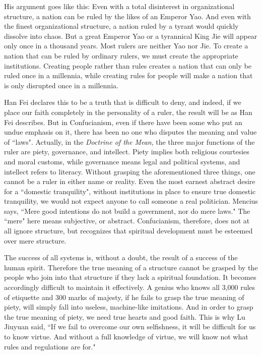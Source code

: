 His argument goes like this: Even with a total disinterest in organizational structure, a nation can be ruled by the likes of an Emperor Yao. And even with the finest organizational structure, a nation ruled by a tyrant would quickly dissolve into chaos. But a great Emperor Yao or a tyrannical King Jie will appear only once in a thousand years. Most rulers are neither Yao nor Jie. To create a nation that can be ruled by ordinary rulers, we must create the appropriate institutions. Creating people rather than rules creates a nation that can only be ruled once in a millennia, while creating rules for people will make a nation that is only disrupted once in a millennia.

Han Fei declares this to be a truth that is difficult to deny, and indeed, if we place our faith completely in the personality of a ruler, the result will be as Han Fei describes. But in Confucianism, even if there have been some who put an undue emphasis on it, there has been no one who disputes the meaning and value of ``laws". Actually, in the \emph{Doctrine of the Mean}, the three major functions of the ruler are piety, governance, and intellect. Piety implies both religious courtesies and moral customs, while governance means legal and political systems, and intellect refers to literacy. Without grasping the aforementioned three things, one cannot be a ruler in either name or reality. Even the most earnest abstract desire for a ``domestic tranquility", without institutions in place to ensure true domestic tranquility, we would not expect anyone to call someone a real politician. Mencius says, ``Mere good intentions do not build a government, nor do mere laws." The ``mere" here means subjective, or abstract. Confucianism, therefore, does not at all ignore structure, but recognizes that spiritual development must be esteemed over mere structure.

The success of all systems is, without a doubt, the result of a success of the human spirit. Therefore the true meaning of a structure cannot be grasped by the people who join into that structure if they lack a spiritual foundation. It becomes accordingly difficult to maintain it effectively. A genius who knows all 3,000 rules of etiquette and 300 marks of majesty, if he fails to grasp the true meaning of piety, will simply fall into useless, machine-like imitations. And in order to grasp the true meaning of piety, we need true hearts and good faith. This is why Lu Jiuyuan said, ``If we fail to overcome our own selfishness, it will be difficult for us to know virtue. And without a full knowledge of virtue, we will know not what rules and regulations are for."

